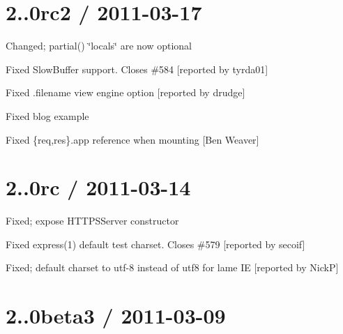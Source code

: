 {\ttfamily \section*{2..\+0rc2 / 2011-\/03-\/17 }}

{\ttfamily }

{\ttfamily 
\begin{DoxyItemize}
\item Changed; {\ttfamily partial()} \char`\"{}locals\char`\"{} are now optional
\item Fixed {\ttfamily Slow\+Buffer} support. Closes \#584 \mbox{[}reported by tyrda01\mbox{]}
\item Fixed .filename view engine option \mbox{[}reported by drudge\mbox{]}
\item Fixed blog example
\item Fixed {\ttfamily \{req,res\}.app} reference when mounting \mbox{[}Ben Weaver\mbox{]}
\end{DoxyItemize}}

{\ttfamily \section*{2..\+0rc / 2011-\/03-\/14 }}

{\ttfamily }

{\ttfamily 
\begin{DoxyItemize}
\item Fixed; expose {\ttfamily H\+T\+T\+P\+S\+Server} constructor
\item Fixed express(1) default test charset. Closes \#579 \mbox{[}reported by secoif\mbox{]}
\item Fixed; default charset to utf-\/8 instead of utf8 for lame IE \mbox{[}reported by NickP\mbox{]}
\end{DoxyItemize}}

{\ttfamily \section*{2..\+0beta3 / 2011-\/03-\/09 }}

{\ttfamily }

